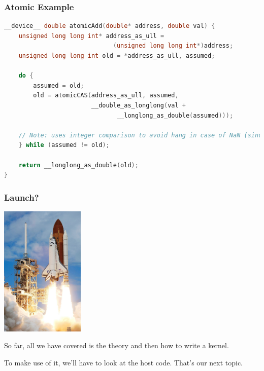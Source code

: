 \begin{frame}[fragile]
\frametitle{Atomic Example}

\begin{lstlisting}[language=C++]
__device__ double atomicAdd(double* address, double val) {
    unsigned long long int* address_as_ull =
                              (unsigned long long int*)address;
    unsigned long long int old = *address_as_ull, assumed;

    do {
        assumed = old;
        old = atomicCAS(address_as_ull, assumed,
                        __double_as_longlong(val +
                               __longlong_as_double(assumed)));

    // Note: uses integer comparison to avoid hang in case of NaN (since NaN != NaN)
    } while (assumed != old);

    return __longlong_as_double(old);
}
\end{lstlisting}

\end{frame}




\begin{frame}
\frametitle{Launch?}

\begin{center}
	\includegraphics[width=0.3\textwidth]{images/launch.jpg}
\end{center}

So far, all we have covered is the theory and then how to write a kernel. 

To make use of it, we'll have to look at the host code. That's our next topic. 

\end{frame}



